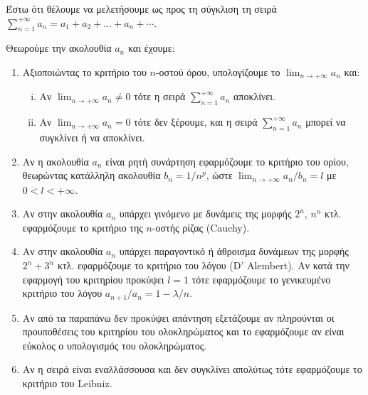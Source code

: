 






\begin{center}
  \minibox{\large\bfseries \textcolor{Col1}{Σύνοψη της μελέτης μιας σειράς ως προς τη
  σύγκλιση}}
\end{center}

\vspace{2\baselineskip}

Έστω ότι θέλουμε να μελετήσουμε ως προς τη σύγκλιση τη σειρά 
$ \sum_{n=1}^{+\infty} a_{n} = a_{1} + a_{2} + \dots + a_{n} + \dotsb $.

Θεωρούμε την ακολουθία  $ a_{n} $ και έχουμε:
\begin{enumerate}
  \item Αξιοποιώντας το κριτήριο του $n$-οστού όρου, υπολογίζουμε το 
    $ \lim_{n\to +\infty} a_{n} $ και:
    \begin{enumerate}[i)]
      \item Αν $ \lim_{n\to +\infty} a_{n} \neq 0 $ τότε η σειρά 
        $ \sum_{n=1}^{+\infty}a_{n} $	αποκλίνει.
      \item Αν $ \lim_{n\to +\infty} a_{n} = 0 $ τότε δεν ξέρουμε, και η σειρά
        $ \sum_{n=1}^{+\infty}a_{n} $ μπορεί να συγκλίνει ή να αποκλίνει.
    \end{enumerate}

  \item Αν η ακολουθία $ a_{n} $ είναι ρητή συνάρτηση  εφαρμόζουμε το κριτήριο του ορίου,
    θεωρώντας κατάλληλη ακολουθία $ b_{n} = 1 / n^{p} $, ώστε 
    $ \lim_{n\to +\infty} a_{n}/b_{n} = l $ με $ 0<l<+\infty $.

  \item Αν στην ακολουθία $ a_{n} $ υπάρχει γινόμενο με δυνάμεις της μορφής 
    $ 2^{n} $, $ n^{n} $ κτλ. εφαρμόζουμε το κριτήριο της $n$-οστής ρίζας (Cauchy).

  \item Αν στην ακολουθία $ a_{n} $ υπάρχει παραγοντικό ή άθροισμα δυνάμεων της μορφής 
    $ 2^{n} + 3^{n}$ κτλ. εφαρμόζουμε το κριτήριο του λόγου (D' Alembert). Αν κατά την
    εφαρμογή του κριτηρίου προκύψει $ l=1 $ τότε εφαρμόζουμε το γενικευμένο κριτήριο 
    του λόγου $ a_{n+1}/a_{n} = 1 - \lambda/n $.

  \item Αν από τα παραπάνω δεν προκύψει απάντηση εξετάζουμε αν πληρούνται οι 
    προυποθέσεις του κριτηρίου του ολοκληρώματος και το εφαρμόζουμε αν είναι εύκολος 
    ο υπολογισμός του ολοκληρώματος.

  \item Αν η σειρά είναι εναλλάσσουσα και δεν συγκλίνει απολύτως τότε εφαρμόζουμε το 
    κριτήριο του Leibniz.
\end{enumerate}



